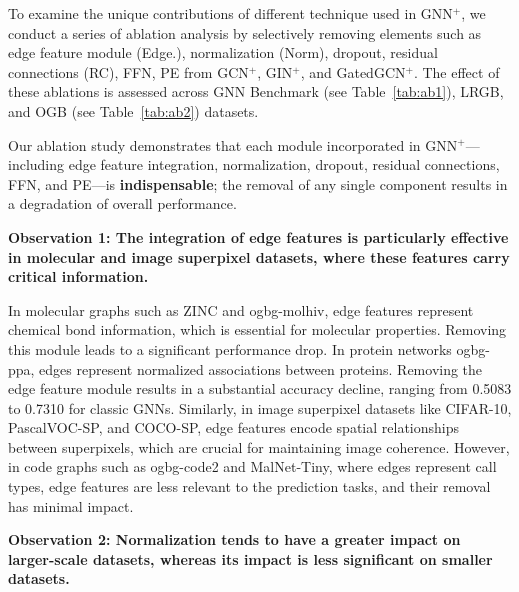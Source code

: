 To examine the unique contributions of different technique used in GNN$^+$, we conduct a series of ablation analysis by selectively removing elements such as edge feature module (Edge.), normalization (Norm), dropout, residual connections (RC), FFN, PE from GCN$^+$, GIN$^+$, and GatedGCN$^+$. The effect of these ablations is assessed across GNN Benchmark (see Table~\ref{tab:ab1}), LRGB, and OGB (see Table~\ref{tab:ab2}) datasets. 

\begin{tcolorbox}[colback=gray!10, colframe=black, boxrule=1pt, arc=1pt, left=3pt, right=3pt, top=2pt, bottom=2pt]
{
Our ablation study demonstrates that each module incorporated in GNN$^+$—including edge feature integration, normalization, dropout, residual connections, FFN, and PE—is \textbf{indispensable}; the removal of any single component results in a degradation of overall performance.
}
\end{tcolorbox}

\textbf{Observation 1: The integration of edge features is particularly effective in molecular and image superpixel datasets, where these features carry critical information.} 

In molecular graphs such as ZINC and ogbg-molhiv, edge features represent chemical bond information, which is essential for molecular properties. Removing this module leads to a significant performance drop. In protein networks ogbg-ppa, edges represent normalized associations between proteins. Removing the edge feature module results in a substantial accuracy decline, ranging from 0.5083 to 0.7310 for classic GNNs. Similarly, in image superpixel datasets like CIFAR-10, PascalVOC-SP, and COCO-SP, edge features encode spatial relationships between superpixels, which are crucial for maintaining image coherence. However, in code graphs such as ogbg-code2 and MalNet-Tiny, where edges represent call types, edge features are less relevant to the prediction tasks, and their removal has minimal impact.

\textbf{Observation 2: 
Normalization tends to have a greater impact on larger-scale datasets, whereas its impact is less significant on smaller datasets.} 


